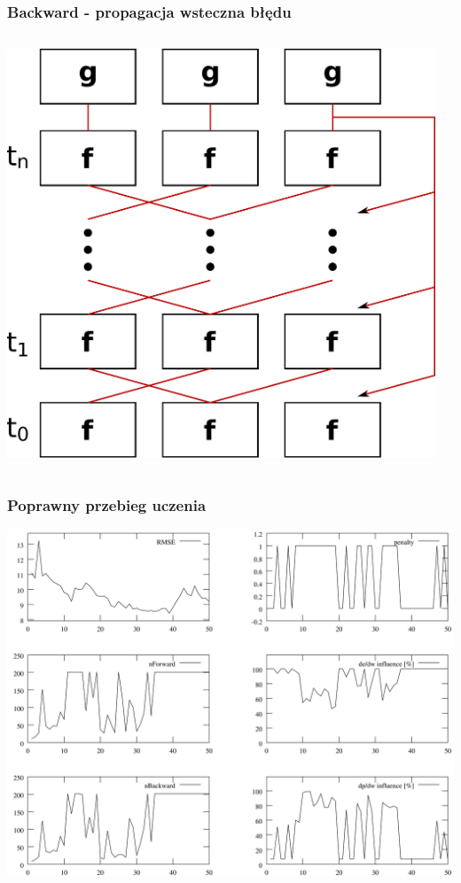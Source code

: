 \documentclass{beamer}
\begin{document}
\begin{frame}
\frametitle{Backward - propagacja wsteczna błędu}
\begin{columns}
	\begin{column}{0.66\textwidth}
		\includegraphics[scale=0.4]{img/backward}
	\end{column}
	\begin{column}{0.34\textwidth}
	\end{column}
\end{columns}
\end{frame}

\begin{frame}
\frametitle{Poprawny przebieg uczenia}
\begin{center}
	\includegraphics[scale=0.06]{img/gnn1_2}
\end{center}
\end{frame}
\end{document}
